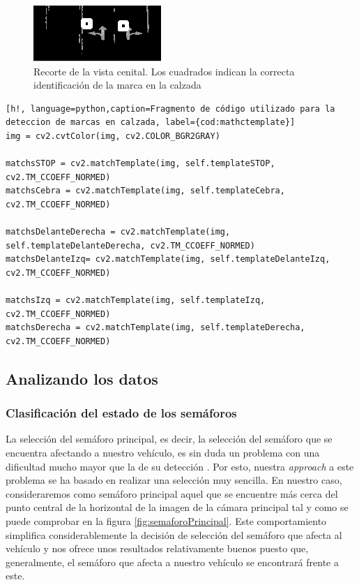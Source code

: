 \begin{figure}[h!]
    \centering
    \includegraphics[width=.8\linewidth]{img/inmeditamenteDelante.png}
    \caption[Detección de marcas en la calzada con \textit{template matching}]{Recorte de la vista cenital. Los cuadrados indican la correcta identificación de la marca en la calzada}
    \label{fig:inmeditamenteDelante}
\end{figure}

\begin{lstlisting}[h!, language=python,caption=Fragmento de código utilizado para la deteccion de marcas en calzada, label={cod:mathctemplate}]
img = cv2.cvtColor(img, cv2.COLOR_BGR2GRAY)
    
matchsSTOP = cv2.matchTemplate(img, self.templateSTOP, cv2.TM_CCOEFF_NORMED)
matchsCebra = cv2.matchTemplate(img, self.templateCebra, cv2.TM_CCOEFF_NORMED)

matchsDelanteDerecha = cv2.matchTemplate(img, self.templateDelanteDerecha, cv2.TM_CCOEFF_NORMED)
matchsDelanteIzq= cv2.matchTemplate(img, self.templateDelanteIzq, cv2.TM_CCOEFF_NORMED)

matchsIzq = cv2.matchTemplate(img, self.templateIzq, cv2.TM_CCOEFF_NORMED)
matchsDerecha = cv2.matchTemplate(img, self.templateDerecha, cv2.TM_CCOEFF_NORMED)
\end{lstlisting}




\clearpage
\subsection{Analizando los datos}

\subsubsection{Clasificación del estado de los semáforos} \label{sec:clasificacionSemáforos}

La selección del semáforo principal, es decir, la selección del semáforo que se encuentra afectando a nuestro vehículo, es sin duda un problema con una dificultad mucho mayor que la de su detección \cite{karpathyAI}. 
Por esto, nuestra \textit{approach} a este problema se ha basado en realizar una selección muy sencilla.
En nuestro caso, consideraremos como  semáforo principal aquel que se encuentre más cerca del punto central de la horizontal de la imagen de la cámara principal tal y como se puede comprobar en la figura \ref{fig:semaforoPrincipal}.
Este comportamiento simplifica considerablemente la decisión de selección del semáforo que afecta al vehículo y nos ofrece unos resultados relativamente buenos puesto que, generalmente, el semáforo que afecta a nuestro vehículo se encontrará frente a este.

